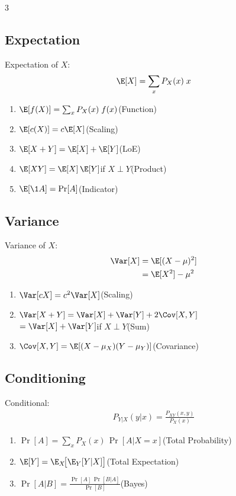 \documentclass[12pt, a4paper]{article}
\begin{document}
\begin{multicols*}{3}
\subsection{Expectation}
Expectation of $X$:
\begin{align*}
  \E[X] = \sum_x P_X(x)\;x
\end{align*}
\begin{enumerate}[\roman*.]
  \item $\E[f(X)] = \sum_x P_X(x)\;f(x)$\hfill(Function)
  \item $\E[c(X)] = c\E[X]$\hfill(Scaling)
  \item $\E[X+Y] = \E[X] + \E[Y]$\hfill(LoE)
  \item $\E[XY] = \E[X]\,\E[Y]$\quad if $X\perp Y$\hfill(Product)
  \item $\E[\1{A}] = \Pr[A]$\hfill(Indicator)
\end{enumerate}

\subsection{Variance}
Variance of $X$:
\begin{align*}
  \Var[X] &= \E[(X-\mu)^2]\\ 
          &= \E[X^2]-\mu^2
\end{align*}
\begin{enumerate}[\roman*.]
  \item $\Var[cX] = c^2\Var[X]$\hfill(Scaling)
  \item $\Var[X+Y] = \Var[X] + \Var[Y] + 2\Cov[X,Y]$\\
    \hspace{5.3em}$=\Var[X] + \Var[Y]$\quad if $X\perp Y$\hfill(Sum)
  \item $\Cov[X,Y] = \E[(X-\mu_X)(Y-\mu_Y)]$\hfill(Covariance)
\end{enumerate}

\colbreak
\subsection{Conditioning}
Conditional:
\begin{align*}
  P_{Y|X}(y|x) = \frac{P_{XY}(x,y)}{P_X(x)}
\end{align*}
\begin{enumerate}[\roman*.]
  \item $\Pr[A] = \sum_x P_X(x)\,\Pr[A|X=x]$\hfill(Total Probability)
  \item $\E[Y] = \E_X\!\big[\E_Y[Y|X]\big]$\hfill(Total Expectation)
  \item $\Pr[A|B] = \frac{\Pr[A]\,\Pr[B|A]}{\Pr[B]}$\hfill(Bayes)
\end{enumerate}


\end{multicols*}
\end{document}
